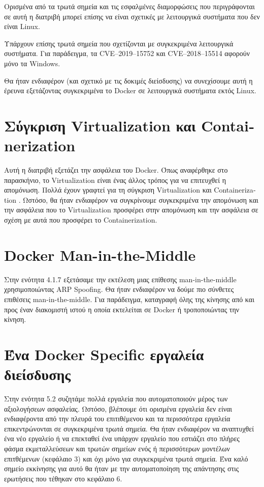 Ορισμένα από τα τρωτά σημεία και τις εσφαλμένες διαμορφώσεις που περιγράφονται
σε αυτή η διατριβή μπορεί επίσης να είναι σχετικές με λειτουργικά συστήματα που
δεν είναι \textlatin{Linux}.


Υπάρχουν επίσης τρωτά σημεία που σχετίζονται με συγκεκριμένα λειτουργικά
συστήματα. Για παράδειγμα, τα \textlatin{CVE–2019–15752} και
\textlatin{CVE–2018–15514} αφορούν μόνο τα \textlatin{Windows}.

Θα ήταν ενδιαφέρον (και σχετικό με τις δοκιμές διείσδυσης) να συνεχίσουμε
αυτή η έρευνα εξετάζοντας συγκεκριμένα το \textlatin{Docker} σε λειτουργικά
συστήματα εκτός \textlatin{Linux}.

\section{Σύγκριση \textlatin{Virtualization} και \textlatin{Containerization}}

Αυτή η διατριβή εξετάζει την ασφάλεια του \textlatin{Docker}. Όπως αναφέρθηκε
στο παρασκήνιο, το \textlatin{Virtualization} είναι ένας άλλος τρόπος για να
επιτευχθεί η απομόνωση. Πολλά έχουν γραφτεί για τη σύγκριση
\textlatin{Virtualization} και \textlatin{Containerization}
\cite{Virtualization-vs-Containerization-to-Support-PaaS}
\cite{Hypervisor-vs-Lightweight-Virtualization}
\cite{Updated-Performance-Comparison-Virtual-Machines-Containers}. Ωστόσο, θα
ήταν ενδιαφέρον να συγκρίνουμε συγκεκριμένα την απομόνωση και την ασφάλεια που
το \textlatin{Virtualization} προσφέρει στην απομόνωση και την ασφάλεια σε σχέση
με αυτά που προσφέρει το \textlatin{Containerization}.


\section{\textlatin{Docker Man-in-the-Middle}}

Στην ενότητα 4.1.7 εξετάσαμε την εκτέλεση μιας επίθεσης
\textlatin{man-in-the-middle} χρησιμοποιώντας \textlatin{ARP Spoofing}. Θα ήταν
ενδιαφέρον να δούμε πιο σύνθετες επιθέσεις \textlatin{man-in-the-middle}. Για
παράδειγμα, καταγραφή όλης της κίνησης από και προς έναν διακομιστή ιστού η
οποία εκτελείται σε \textlatin{Docker} ή τροποποιώντας την κίνηση.

\section{\textlatin{Ένα \textlatin{Docker Specific} εργαλεία διείσδυσης}}

Στην ενότητα 5.2 συζητάμε πολλά εργαλεία που αυτοματοποιούν μέρος των
αξιολογήσεων ασφαλείας. Ωστόσο, βλέπουμε ότι ορισμένα εργαλεία δεν είναι
ενδιαφέροντα από την πλευρά του επιτιθέμενου και τα περισσότερα εργαλεία
επικεντρώνονται σε συγκεκριμένα τρωτά σημεία. Θα ήταν ενδιαφέρον να αναπτυχθεί
ένα νέο εργαλείο ή να επεκταθεί ένα υπάρχον εργαλείο που εστιάζει στο
πλήρες φάσμα εκμεταλλεύσεων και τρωτών σημείων ενός ή περισσότερων μοντέλων
επιτθέμενων (κεφάλαιο 3) και όχι μόνο για συγκεκριμένα τρωτά σημεία. Ένα καλό
σημείο εκκίνησης για αυτό θα ήταν με την αυτοματοποίηση της απάντησης στις
ερωτήσεις που τέθηκαν στο κεφάλαιο 6.
